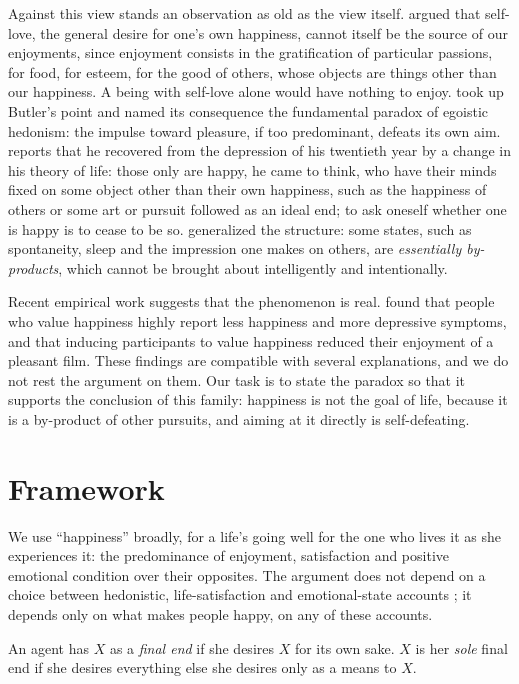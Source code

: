 \documentclass{situationist-preprint}
\begin{document}
Against this view stands an observation as old as the view itself. \citet[Sermon XI]{Butler1726} argued that self-love, the general desire for one's own happiness, cannot itself be the source of our enjoyments, since enjoyment consists in the gratification of particular passions, for food, for esteem, for the good of others, whose objects are things other than our happiness. A being with self-love alone would have nothing to enjoy. \citet[I.4 and II.3]{Sidgwick1907} took up Butler's point and named its consequence the fundamental paradox of egoistic hedonism: the impulse toward pleasure, if too predominant, defeats its own aim. \citet[ch.~V]{Mill1873} reports that he recovered from the depression of his twentieth year by a change in his theory of life: those only are happy, he came to think, who have their minds fixed on some object other than their own happiness, such as the happiness of others or some art or pursuit followed as an ideal end; to ask oneself whether one is happy is to cease to be so. \citet[ch.~II]{Elster1983} generalized the structure: some states, such as spontaneity, sleep and the impression one makes on others, are \emph{essentially by-products}, which cannot be brought about intelligently and intentionally.

Recent empirical work suggests that the phenomenon is real. \citet{MaussEtAl2011} found that people who value happiness highly report less happiness and more depressive symptoms, and that inducing participants to value happiness reduced their enjoyment of a pleasant film. These findings are compatible with several explanations, and we do not rest the argument on them. Our task is to state the paradox so that it supports the conclusion of this family: happiness is not the goal of life, because it is a by-product of other pursuits, and aiming at it directly is self-defeating.

\section{Framework}

We use \enquote{happiness} broadly, for a life's going well for the one who lives it as she experiences it: the predominance of enjoyment, satisfaction and positive emotional condition over their opposites. The argument does not depend on a choice between hedonistic, life-satisfaction and emotional-state accounts \citep{Haybron2008}; it depends only on what makes people happy, on any of these accounts.

\begin{definition}\label{d:final}
An agent has $X$ as a \emph{final end} if she desires $X$ for its own sake. $X$ is her \emph{sole} final end if she desires everything else she desires only as a means to $X$.
\end{definition}
\end{document}
